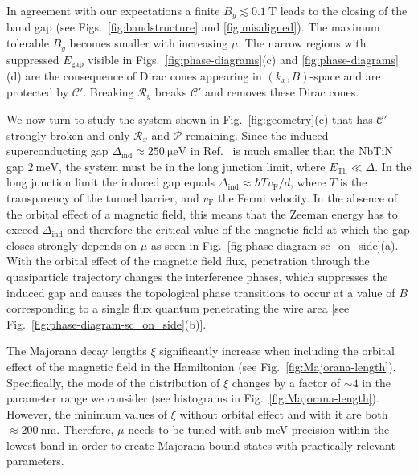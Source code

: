 In agreement with our expectations a finite $B_y \lesssim \SI{0.1}{\tesla}$ leads to the closing of the band gap (see Figs.~\ref{fig:bandstructure} and \ref{fig:misaligned}).
The maximum tolerable $B_y $ becomes smaller with increasing $\mu$.
The narrow regions with suppressed $E_\textrm{gap}$ visible in Figs.~\ref{fig:phase-diagrams}(c) and \ref{fig:phase-diagrams}(d) are the consequence of Dirac cones appearing in $(k_{x}, B)$-space and are protected by $\mathcal{C}'$.
Breaking $\mathcal{R}_y$ breaks $\mathcal{C}'$ and removes these Dirac cones.


We now turn to study the system shown in Fig.~\ref{fig:geometry}(c) that has $\mathcal{C}'$ strongly broken and only $\mathcal{R}_x$ and $\mathcal{P}$ remaining.
Since the induced superconducting gap $\Delta_\textrm{ind}\approx \SI{250}{\micro\electronvolt}$ in Ref.~\cite{Mourik2012} is much smaller than the $\mathrm{NbTiN}$ gap $\SI{2}{\milli\electronvolt}$, the system must be in the long junction limit, where $E_\textrm{Th} \ll \Delta$.
In the long junction limit the induced gap equals $\Delta_\textrm{ind}\approx\hbar T v_\textrm{F} / d$, where $T$ is the transparency of the tunnel barrier, and $v_\textrm{F}$ the Fermi velocity.
In the absence of the orbital effect of a magnetic field, this means that the Zeeman energy has to exceed $\Delta_\textrm{ind}$ and therefore the critical value of the magnetic field at which the gap closes strongly depends on $\mu$ as seen in Fig.~\ref{fig:phase-diagram-sc_on_side}(a).
With the orbital effect of the magnetic field flux, penetration through the quasiparticle trajectory changes the interference phases, which suppresses the induced gap and causes the topological phase transitions to occur at a value of $B$ corresponding to a single flux quantum penetrating the wire area [see Fig.~\ref{fig:phase-diagram-sc_on_side}(b)].

The Majorana decay lengths $\xi$ significantly increase when including the orbital effect of the magnetic field in the Hamiltonian (see Fig.~\ref{fig:Majorana-length}).
Specifically, the mode of the distribution of $\xi$ changes by a factor of $\sim 4$ in the parameter range we consider (see histograms in Fig.~\ref{fig:Majorana-length}).
However, the minimum values of $\xi$ without orbital effect and with it are both $\approx \SI{200}{\nano\metre}$.
Therefore, $\mu$ needs to be tuned with sub-meV precision within the lowest band in order to create Majorana bound states with practically relevant parameters.

